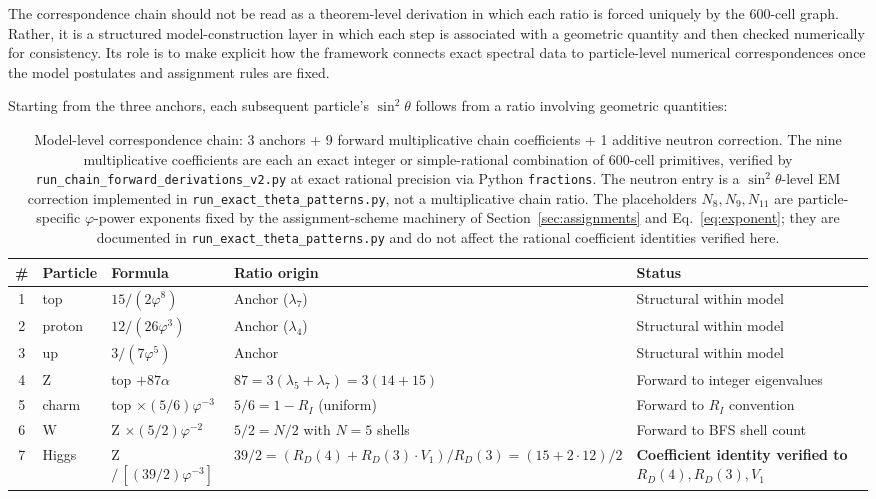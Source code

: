 \documentclass[12pt]{article}
\newcommand{\phig}{\varphi}
\begin{document}
The correspondence chain should not be read as a theorem-level derivation in which each ratio is forced uniquely by the 600-cell graph. Rather, it is a structured model-construction layer in which each step is associated with a geometric quantity and then checked numerically for consistency. Its role is to make explicit how the framework connects exact spectral data to particle-level numerical correspondences once the model postulates and assignment rules are fixed.

Starting from the three anchors, each subsequent particle's $\sin^2\theta$ follows from a ratio involving geometric quantities:

\begin{table}[ht]
\centering
\caption{Model-level correspondence chain: 3 anchors + 9 forward multiplicative chain coefficients + 1 additive neutron correction. The nine multiplicative coefficients are each an exact integer or simple-rational combination of 600-cell primitives, verified by \texttt{run\_chain\_forward\_derivations\_v2.py} at exact rational precision via Python \texttt{fractions}. The neutron entry is a $\sin^2\theta$-level EM correction implemented in \texttt{run\_exact\_theta\_patterns.py}, not a multiplicative chain ratio. The placeholders $N_8, N_9, N_{11}$ are particle-specific $\phig$-power exponents fixed by the assignment-scheme machinery of Section~\ref{sec:assignments} and Eq.~\eqref{eq:exponent}; they are documented in \texttt{run\_exact\_theta\_patterns.py} and do not affect the rational coefficient identities verified here.}
\label{tab:chain}
\begin{tabular}{@{}cllll@{}}
\toprule
\# & Particle & Formula & Ratio origin & Status \\
\midrule
1 & top & $15/(2\phig^8)$ & Anchor ($\lambda_7$) & Structural within model \\
2 & proton & $12/(26\phig^3)$ & Anchor ($\lambda_4$) & Structural within model \\
3 & up & $3/(7\phig^5)$ & Anchor & Structural within model \\
4 & Z & top $+ 87\alpha$ & $87 = 3(\lambda_5 + \lambda_7) = 3(14 + 15)$ & Forward to integer eigenvalues \\
5 & charm & top $\times (5/6)\phig^{-3}$ & $5/6 = 1 - R_I$ (uniform) & Forward to $R_I$ convention \\
6 & W & Z $\times (5/2)\phig^{-2}$ & $5/2 = N/2$ with $N = 5$ shells & Forward to BFS shell count \\
7 & Higgs & Z $/\, [(39/2)\phig^{-3}]$ & $39/2 = (R_D(4) + R_D(3) \cdot V_1) / R_D(3) = (15 + 2 \cdot 12)/2$ & \textbf{Coefficient identity verified to $R_D(4), R_D(3), V_1$} \\

\end{tabular}
\end{table}
\end{document}
